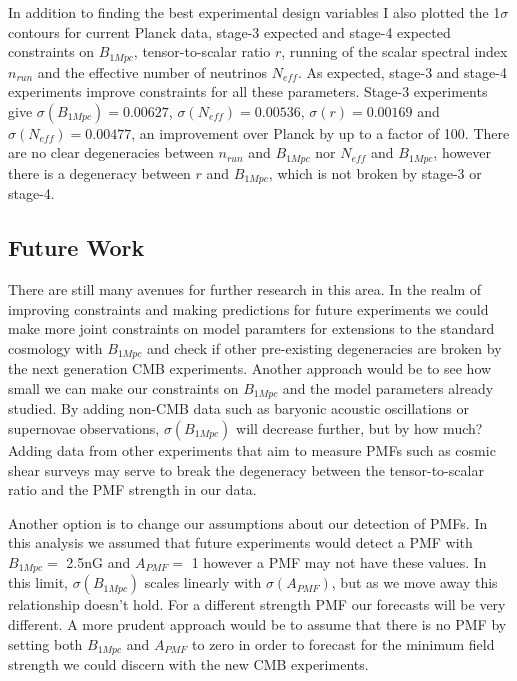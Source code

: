 In addition to finding the best experimental design variables I also plotted the 1$\sigma$ contours for current Planck data, stage-3 expected and stage-4 expected constraints on $B_{1Mpc}$, tensor-to-scalar ratio $r$, running of the scalar spectral index $n_{run}$ and the effective number of neutrinos $N_{eff}$. As expected, stage-3 and stage-4 experiments improve constraints for all these parameters. Stage-3 experiments give $\sigma(B_{1Mpc}) = 0.00627$, $\sigma(N_{eff}) = 0.00536$, $\sigma(r) = 0.00169$ and $\sigma(N_{eff}) = 0.00477$, an improvement over Planck by up to a factor of 100. There are no clear degeneracies between $n_{run}$ and $B_{1Mpc}$ nor $N_{eff}$ and $B_{1Mpc}$, however there is a degeneracy between $r$ and $B_{1Mpc}$, which is not broken by stage-3 or stage-4.

\subsection{Future Work}

There are still many avenues for further research in this area. In the realm of improving constraints and making predictions for future experiments we could make more joint constraints on model paramters for extensions to the standard cosmology with $B_{1Mpc}$ and check if other pre-existing degeneracies are broken by the next generation CMB experiments. Another approach would be to see how small we can make our constraints on $B_{1Mpc}$ and the model parameters already studied. By adding non-CMB data such as baryonic acoustic oscillations or supernovae observations, $\sigma(B_{1Mpc})$ will decrease further, but by how much? Adding data from other experiments that aim to measure PMFs such as cosmic shear surveys \cite{2012JCAP...11..055F} may serve to break the degeneracy between the tensor-to-scalar ratio and the PMF strength in our data.

Another option is to change our assumptions about our detection of PMFs. In this analysis we assumed that future experiments would detect a PMF with $B_{1Mpc} =$ 2.5nG and $A_{PMF} =$ 1 however a PMF may not have these values. In this limit, $\sigma(B_{1Mpc})$ scales linearly with $\sigma(A_{PMF})$, but as we move away this relationship doesn't hold. For a different strength PMF our forecasts will be very different. A more prudent approach would be to assume that there is no PMF by setting both $B_{1Mpc}$ and $A_{PMF}$ to zero in order to forecast for the minimum field strength we could discern with the new CMB experiments.

